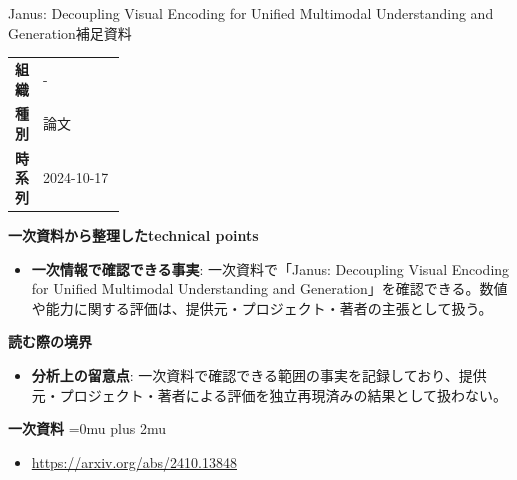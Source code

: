 \begin{technicalnote}{Janus: Decoupling Visual Encoding for Unified Multimodal Understanding and Generation}{補足資料}
\begingroup
\begin{tabularx}{\linewidth}{@{}>{\bfseries}p{0.22\linewidth}X@{}}
組織 & - \\
種別 & 論文 \\
時系列 & 2024-10-17 \\
\end{tabularx}
\smallskip
{\bfseries 一次資料から整理したtechnical points}
\begin{itemize}[leftmargin=1.5em,itemsep=0.35em]
\item \textbf{一次情報で確認できる事実}: 一次資料で「Janus: Decoupling Visual Encoding for Unified Multimodal Understanding and Generation」を確認できる。数値や能力に関する評価は、提供元・プロジェクト・著者の主張として扱う。
\end{itemize}
\begin{minipage}{\linewidth}
{\bfseries 読む際の境界}
\begin{itemize}[leftmargin=1.5em,itemsep=0.35em]
\item \textbf{分析上の留意点}: 一次資料で確認できる範囲の事実を記録しており、提供元・プロジェクト・著者による評価を独立再現済みの結果として扱わない。
\end{itemize}
\begin{samepage}
{\bfseries 一次資料}
\begingroup\sloppy
\Urlmuskip=0mu plus 2mu\relax
\begin{itemize}[leftmargin=1.5em,itemsep=0.25em]
\item {\scriptsize\url{https://arxiv.org/abs/2410.13848}}
\end{itemize}
\endgroup
\end{samepage}
\end{minipage}
\endgroup
\end{technicalnote}
\medskip

